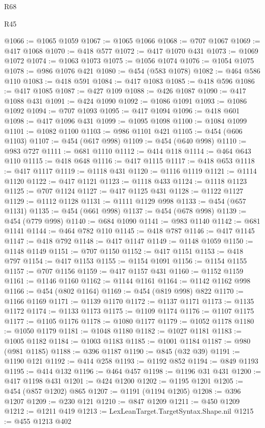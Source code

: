 \begin{lexlean}{R68}
\begin{lexlean}{R45}
\begin{coremodule}
{{{{{{{{{{{{{{{{{{{{{{{{{{{{{{{{{{{{{{{{{{{{{{{{{{{{{{{{{{{{{{{{{{{{{{{{{{{{{{{{{{{{{{{{{{{@1066 := @1065 @1059
@1067 := @1065 @1066
@1068 := @707 @1067
@1069 := @417 @1068
@1070 := @418 @577
@1072 := @417 @1070 @431
@1073 := @1069 @1072
@1074 := @1063 @1073
@1075 := @1056 @1074
@1076 := @1054 @1075
@1078 := @986 @1076 @421
@1080 := @454 (@583 @1078)
@1082 := @464 @586 @110
@1083 := @418 @591
@1084 := @417 @1083
@1085 := @418 @596
@1086 := @417 @1085
@1087 := @427 @109
@1088 := @426 @1087
@1090 := @417 @1088 @431
@1091 := @424 @1090
@1092 := @1086 @1091
@1093 := @1086 @1092
@1094 := @707 @1093
@1095 := @417 @1094
@1096 := @418 @601
@1098 := @417 @1096 @431
@1099 := @1095 @1098
@1100 := @1084 @1099
@1101 := @1082 @1100
@1103 := @986 @1101 @421
@1105 := @454 (@606 @1103)
@1107 := @454 (@617 @998)
@1109 := @454 (@640 @998)
@1110 := @983 @727
@1111 := @681 @1110
@1112 := @414 @118
@1114 := @464 @643 @110
@1115 := @418 @648
@1116 := @417 @1115
@1117 := @418 @653
@1118 := @417 @1117
@1119 := @1118 @431
@1120 := @1116 @1119
@1121 := @1114 @1120
@1122 := @417 @1121
@1123 := @1118 @433
@1124 := @1118 @1123
@1125 := @707 @1124
@1127 := @417 @1125 @431
@1128 := @1122 @1127
@1129 := @1112 @1128
@1131 := @1111 @1129 @998
@1133 := @454 (@657 @1131)
@1135 := @454 (@661 @998)
@1137 := @454 (@678 @998)
@1139 := @454 (@779 @998)
@1140 := @684 @1090
@1141 := @983 @1140
@1142 := @681 @1141
@1144 := @464 @782 @110
@1145 := @418 @787
@1146 := @417 @1145
@1147 := @418 @792
@1148 := @417 @1147
@1149 := @1148 @1059
@1150 := @1148 @1149
@1151 := @707 @1150
@1152 := @417 @1151
@1153 := @418 @797
@1154 := @417 @1153
@1155 := @1154 @1091
@1156 := @1154 @1155
@1157 := @707 @1156
@1159 := @417 @1157 @431
@1160 := @1152 @1159
@1161 := @1146 @1160
@1162 := @1144 @1161
@1164 := @1142 @1162 @998
@1166 := @454 (@802 @1164)
@1169 := @454 (@819 @998) @822
@1170 := @1166 @1169
@1171 := @1139 @1170
@1172 := @1137 @1171
@1173 := @1135 @1172
@1174 := @1133 @1173
@1175 := @1109 @1174
@1176 := @1107 @1175
@1177 := @1105 @1176
@1178 := @1080 @1177
@1179 := @1052 @1178
@1180 := @1050 @1179
@1181 := @1048 @1180
@1182 := @1027 @1181
@1183 := @1005 @1182
@1184 := @1003 @1183
@1185 := @1001 @1184
@1187 := @980 (@981 @1185)
@1188 := @396 @1187
@1190 := @845 (@32 @39)
@1191 := @1190 @121
@1192 := @414 @258
@1193 := @1192 @852
@1194 := @849 @1193
@1195 := @414 @132
@1196 := @464 @457
@1198 := @1196 @31 @431
@1200 := @417 @1198 @431
@1201 := @424 @1200
@1202 := @1195 @1201
@1205 := @454 (@857 @1202) @865
@1207 := @1191 (@1194 @1205)
@1208 := @396 @1207
@1209 := @230 @121
@1210 := @847 @1209
@1211 := @450 @1209
@1212 := @1211 @419
@1213 := LexLeanTarget.TargetSyntax.Shape.nil
@1215 := @455 @1213 @402
}}}}}}}}}}}}}}}}}}}}}}}}}}}}}}}}}}}}}}}}}}}}}}}}}}}}}}}}}}}}}}}}}}}}}}}}}}}}}}}}}}}}}}}}}}}
\end{coremodule}
\end{lexlean}
\end{lexlean}
